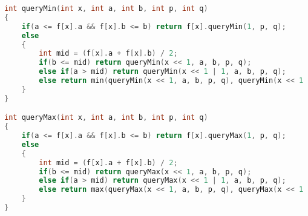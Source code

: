 \begin{lstlisting}[language=C++]
int queryMin(int x, int a, int b, int p, int q)
{
    if(a <= f[x].a && f[x].b <= b) return f[x].queryMin(1, p, q);
    else
    {
        int mid = (f[x].a + f[x].b) / 2;
        if(b <= mid) return queryMin(x << 1, a, b, p, q);
        else if(a > mid) return queryMin(x << 1 | 1, a, b, p, q);
        else return min(queryMin(x << 1, a, b, p, q), queryMin(x << 1 | 1, a, b, p, q));
    }
}

int queryMax(int x, int a, int b, int p, int q)
{
    if(a <= f[x].a && f[x].b <= b) return f[x].queryMax(1, p, q);
    else
    {
        int mid = (f[x].a + f[x].b) / 2;
        if(b <= mid) return queryMax(x << 1, a, b, p, q);
        else if(a > mid) return queryMax(x << 1 | 1, a, b, p, q);
        else return max(queryMax(x << 1, a, b, p, q), queryMax(x << 1 | 1, a, b, p, q));
    }
}

\end{lstlisting}